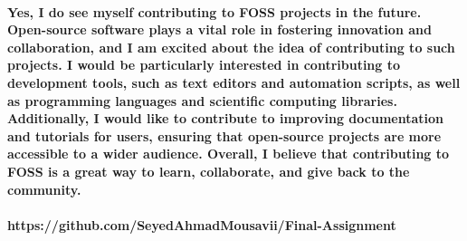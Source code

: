 \documentclass{article}
\begin{document}
\paragraph{Yes, I do see myself contributing to FOSS projects in the future. Open-source software plays a vital role in fostering innovation and collaboration, and I am excited about the idea of contributing to such projects. I would be particularly interested in contributing to development tools, such as text editors and automation scripts, as well as programming languages and scientific computing libraries. Additionally, I would like to contribute to improving documentation and tutorials for users, ensuring that open-source projects are more accessible to a wider audience. Overall, I believe that contributing to FOSS is a great way to learn, collaborate, and give back to the community.}
\paragraph{https://github.com/SeyedAhmadMousavii/Final-Assignment}
\end{document}
